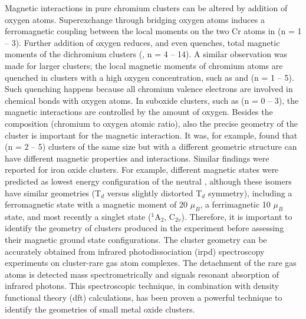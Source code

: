 \begin{refsection}
Magnetic interactions in pure chromium clusters can be altered by addition of oxygen atoms. Superexchange through bridging oxygen atoms induces a ferromagnetic coupling between the local moments on the two Cr atoms in  (n = 1 -- 3). \cite{Tono2003,Tono2003B}  Further addition of oxygen reduces, and even quenches, total magnetic moments of the dichromium clusters (, n = 4 -- 14).\cite{Reddy2000Cr2On,GutsevCr2On} A similar observation was made for larger clusters; the local magnetic moments of chromium atoms are quenched in clusters with a high oxygen concentration, such as  and  (n = 1 -- 5).\cite{Li2012,Zhai2008} Such quenching happens because all chromium valence electrons are involved in chemical bonds with oxygen atoms. In suboxide clusters, such as  (n = 0 -- 3), the magnetic interactions are controlled by the amount of oxygen. \cite{Janssens2007} Besides the composition (chromium to oxygen atomic ratio), also the precise geometry of the cluster is important for the magnetic interaction. It was, for example, found that  (n = 2 -- 5) clusters of the same size but with a different geometric structure can have different magnetic properties and interactions. \cite{ pakiari2016, Shah2018} Similar findings were reported for iron oxide clusters. For example, different magnetic states were predicted as lowest energy configuration of the neutral , although these isomers have similar geometries (T$_d$ versus slightly distorted T$_d$ symmetry), including a ferromagnetic state with a magnetic moment of 20 $\mu_B$, \cite{fe4o6-Ding} a ferrimagnetic 10 $\mu_B$ state, \cite{fe4o6-Kirilyuk} and most recently a singlet state ($^1$A$_2$, C$_{2v}$). \cite{Logemann2015, Erlebach14} Therefore, it is important to identify the geometry of clusters produced in the experiment before assessing their magnetic ground state configurations. The cluster geometry can be accurately obtained from infrared photodissociation (\acrshort{irpd}) spectroscopy experiments on cluster-rare gas atom complexes. The detachment of the rare gas atoms is detected mass spectrometrically and signals resonant absorption of infrared photons. This spectroscopic technique, in combination with density functional theory (\acrshort{dft}) calculations, has been proven a powerful technique to identify the geometries of small metal oxide clusters. \cite{Janssens2001, Logemann2015, Sant2008, Mathias03, Asmis07, Dijk2014} 







\end{refsection}
